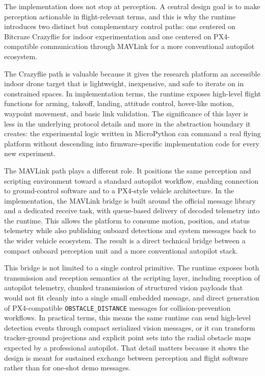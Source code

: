 The implementation does not stop at perception. A central design goal is
to make perception actionable in flight-relevant terms, and this is why
the runtime introduces two distinct but complementary control paths: one
centered on Bitcraze Crazyflie for indoor experimentation and one
centered on PX4-compatible communication through MAVLink for a more
conventional autopilot ecosystem.

The Crazyflie path is valuable because it gives the research platform an
accessible indoor drone target that is lightweight, inexpensive, and
safe to iterate on in constrained spaces. In implementation terms, the
runtime exposes high-level flight functions for arming, takeoff,
landing, attitude control, hover-like motion, waypoint movement, and
basic link validation. The significance of this layer is less in the
underlying protocol details and more in the abstraction boundary it
creates: the experimental logic written in MicroPython can command a
real flying platform without descending into firmware-specific
implementation code for every new experiment.

The MAVLink path plays a different role. It positions the same
perception and scripting environment toward a standard autopilot
workflow, enabling connection to ground-control software and to a
PX4-style vehicle architecture. In the implementation, the MAVLink
bridge is built around the official message library and a dedicated
receive task, with queue-based delivery of decoded telemetry into the
runtime. This allows the platform to consume motion, position, and
status telemetry while also publishing onboard detections and system
messages back to the wider vehicle ecosystem. The result is a direct
technical bridge between a compact onboard perception unit and a more
conventional autopilot stack.

This bridge is not limited to a single control primitive. The runtime
exposes both transmission and reception semantics at the scripting
layer, including reception of autopilot telemetry, chunked transmission
of structured vision payloads that would not fit cleanly into a single
small embedded message, and direct generation of PX4-compatible
\texttt{OBSTACLE\_DISTANCE} messages for collision-prevention workflows.
In practical terms, this means the same runtime can send high-level
detection events through compact serialized vision messages, or it can
transform tracker-ground projections and explicit point sets into the
radial obstacle maps expected by a professional autopilot. That detail
matters because it shows the design is meant for sustained exchange
between perception and flight software rather than for one-shot demo
messages.

